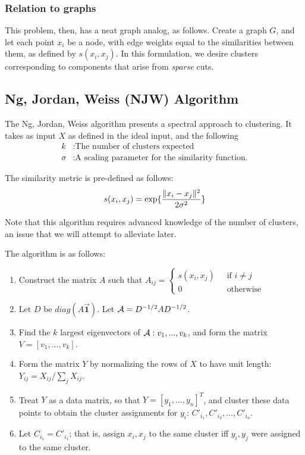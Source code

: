 \subsubsection{Relation to graphs}
This problem, then, has a neat graph analog, as follows. Create a graph $G$, and
let each point $x_i$ be a node, with edge weights equal to the
similarities between them, as defined by $s(x_i, x_j)$. In this formulation, we
desire clusters corresponding to components that arise from \textit{sparse}
cuts.

\subsection{Ng, Jordan, Weiss (NJW) Algorithm}
The Ng, Jordan, Weiss algorithm presents a spectral approach to clustering. It
takes as input $X$ as defined in the ideal input, and the following
\begin{align*}
    k &: \text{The number of clusters expected} \\
    \sigma &: \text{A scaling parameter for the similarity function.}
\end{align*}

The similarity metric is pre-defined as follows:
\begin{align*}
    s(x_i, x_j) = \exp\{\frac{\lVert x_i - x_j\rVert^2}{2\sigma^2}\}
\end{align*}

Note that this algorithm requires advanced knowledge of the number of clusters,
an issue  that we will attempt to alleviate later.

The algorithm is as follows:
\begin{enumerate}
    \item Construct the matrix $A$ such that $A_{ij} = \begin{cases}s(x_i, x_j) &\;\text{ if } i \neq j \\
                                                                    0           &\;\text{ otherwise}\end{cases}$
    \item Let $D$ be $diag(A \vec{\mathbf{1}})$. Let $\mathcal{A} = D^{-1/2} A D^{-1/2}$.
    \item Find the $k$ largest eigenvectors of $\mathcal{A}: v_1,...,v_k$, and form the
            matrix $V = [v_1, ..., v_k]$.
    \item Form the matrix $Y$ by normalizing the rows of $X$ to have unit length:
            $Y_{ij} = X_{ij} / \sum_j X_{ij}$.
    \item Treat $Y$ as a data matrix, so that $Y = [y_1, ..., y_n]^T$, and
        cluster these data points to obtain the cluster assignments for $y_i$:
        $C'_{i_1}, C'_{i_2}, ..., C'_{i_n}$.
    \item Let $C_{i_1} = C'_{i_1}$; that is, assign $x_i, x_j$ to the same cluster
        iff $y_i, y_j$ were assigned to the same cluster.
\end{enumerate}

